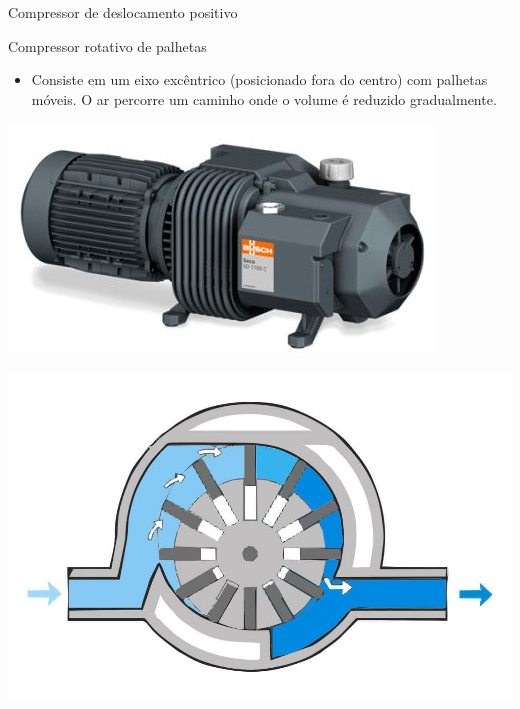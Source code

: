 \begin{frame}{Compressor de deslocamento positivo}
	\begin{block}{Compressor rotativo de palhetas}
		\begin{itemize}
			\item Consiste em um eixo excêntrico (posicionado fora do centro) com palhetas móveis. O ar percorre um caminho onde o volume é reduzido gradualmente.
		\end{itemize}
	\end{block}

	\vspace{0.5cm}
	
	\begin{minipage}{0.45\linewidth}
		\centering
		\includegraphics[width=1\linewidth]{Figuras/Ch12/fig2}
	\end{minipage}
	\hfill
	\begin{minipage}{0.45\linewidth}
		\centering
		\includegraphics[width=1\linewidth]{Figuras/Ch12/fig3}
	\end{minipage}
\end{frame}



